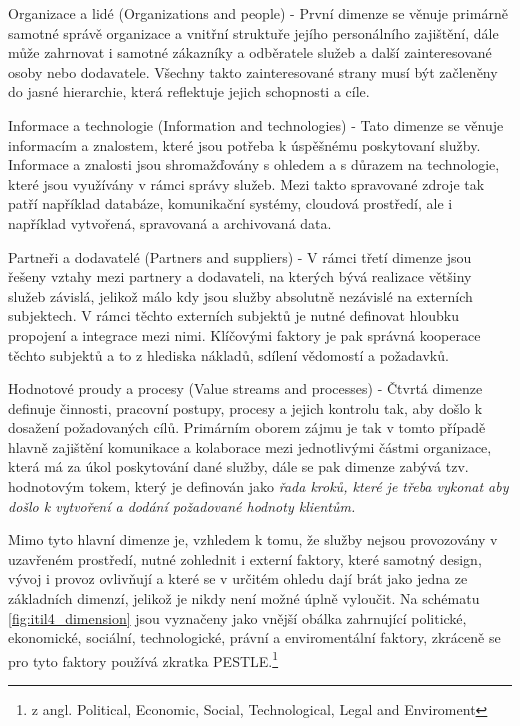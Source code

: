 \documentclass[
  digital,     %
  twoside,     %
  lof,         %
  lot,         %
]{fithesis4}
\begin{document}
\begin{compactitem}
    \item Organizace a lidé (Organizations and people) - První dimenze se věnuje primárně samotné správě organizace a vnitřní struktuře jejího personálního zajištění, dále může zahrnovat i samotné zákazníky a odběratele služeb a další zainteresované osoby nebo dodavatele. Všechny takto zainteresované strany musí být začleněny do jasné hierarchie, která reflektuje jejich schopnosti a cíle. 
    \item Informace a technologie (Information and technologies) - Tato dimenze se věnuje informacím a znalostem, které jsou potřeba k úspěšnému poskytovaní služby. Informace a znalosti jsou shromažďovány s ohledem a s důrazem na technologie, které jsou využívány v rámci správy služeb. Mezi takto spravované zdroje tak patří například databáze, komunikační systémy, cloudová prostředí, ale i například vytvořená, spravovaná a archivovaná data.
    \item Partneři a dodavatelé (Partners and suppliers) - V rámci třetí dimenze jsou řešeny vztahy mezi partnery a dodavateli, na kterých bývá realizace většiny služeb závislá, jelikož málo kdy jsou služby absolutně nezávislé na externích subjektech. V rámci těchto externích subjektů je nutné definovat hloubku propojení a integrace mezi nimi. Klíčovými faktory je pak správná kooperace těchto subjektů a to z hlediska nákladů, sdílení vědomostí a požadavků.
    \item Hodnotové proudy a procesy (Value streams and processes) - Čtvrtá dimenze definuje činnosti, pracovní postupy, procesy a jejich kontrolu tak, aby došlo k dosažení požadovaných cílů. Primárním oborem zájmu je tak v tomto případě hlavně zajištění komunikace a kolaborace mezi jednotlivými částmi organizace, která má za úkol poskytování dané služby, dále se pak dimenze zabývá tzv. hodnotovým tokem, který je definován jako \emph{řada kroků, které je třeba vykonat aby došlo k vytvoření a dodání požadované hodnoty klientům.}
\end{compactitem}
    
Mimo tyto hlavní dimenze je, vzhledem k tomu, že služby nejsou provozovány v uzavřeném prostředí, nutné zohlednit i externí faktory, které samotný design, vývoj i provoz ovlivňují a které se v určitém ohledu dají brát jako jedna ze základních dimenzí, jelikož je nikdy není možné úplně vyloučit. Na schématu \ref{fig:itil4_dimension} jsou vyznačeny jako vnější obálka zahrnující politické, ekonomické, sociální, technologické, právní a enviromentální faktory, zkráceně se pro tyto faktory používá zkratka PESTLE.\footnote{z angl. Political, Economic, Social, Technological, Legal and Enviroment}
\end{document}

